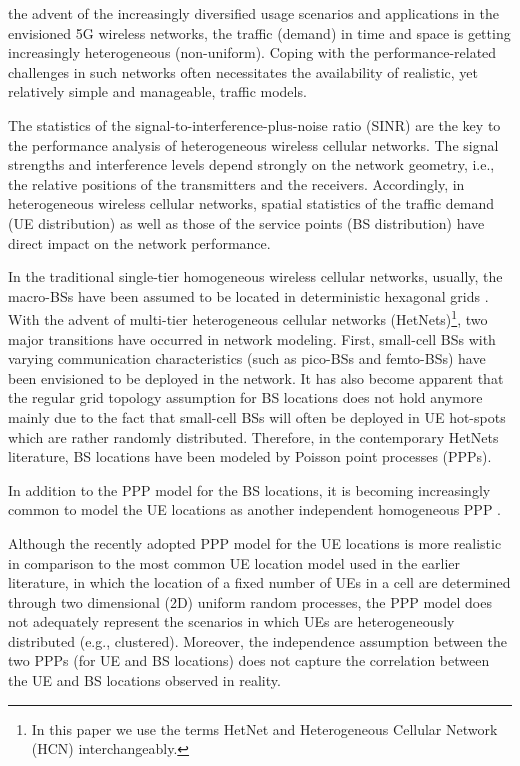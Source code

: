 \documentclass[journal]{IEEEtran}
\begin{document}
 the advent of the increasingly diversified usage scenarios and applications in the envisioned 5G wireless networks, the traffic (demand) in time and space is getting increasingly heterogeneous (non-uniform). Coping with the performance-related challenges in such networks often necessitates the availability of realistic, yet relatively simple and manageable, traffic models. 

The statistics of the signal-to-interference-plus-noise ratio (SINR) are the key to the performance analysis of heterogeneous wireless cellular networks. The signal strengths and interference levels depend strongly on the network geometry, i.e., the relative positions of the transmitters and the receivers. Accordingly, in heterogeneous wireless cellular networks, spatial statistics of the traffic demand (UE distribution) as well as those of the service points (BS distribution) have direct impact on the network performance.

In the traditional single-tier homogeneous wireless cellular networks, usually, the macro-BSs have been assumed to be located in deterministic hexagonal grids \cite{ITU-R2008}. With the advent of multi-tier heterogeneous cellular networks (HetNets)\footnote{In this paper we use the terms HetNet and Heterogeneous Cellular Network (HCN) interchangeably.}, two major transitions have occurred in network modeling. First, small-cell BSs with varying communication characteristics (such as pico-BSs and femto-BSs) have been envisioned to be deployed in the network. It has also become apparent that the regular grid topology assumption for BS locations does not hold anymore mainly due to the fact that small-cell BSs will often be deployed in UE hot-spots which are rather randomly distributed. Therefore, in the contemporary HetNets literature, BS locations have been modeled by Poisson point processes (PPPs).

In addition to the PPP model for the BS locations, it is becoming increasingly common to model the UE locations as another independent homogeneous PPP \cite{andrews2010primer,damnjanovic2011survey}.

Although the recently adopted PPP model for the UE locations is more realistic in comparison to the most common UE location model used in the earlier literature, in which the location of a fixed number of UEs in a cell are determined through two dimensional (2D) uniform random processes, the PPP model does not adequately represent the scenarios in which UEs are heterogeneously distributed (e.g., clustered). Moreover, the independence assumption between the two PPPs (for UE and BS locations) does not capture the correlation between the UE and BS locations observed in reality.
\end{document}
